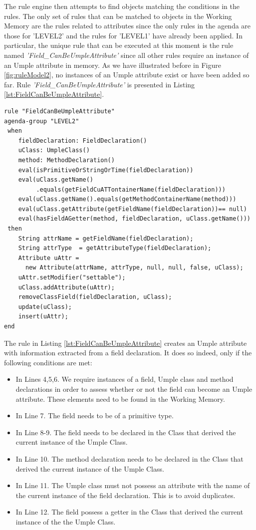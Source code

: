 The rule engine then attempts to find objects matching the conditions in the rules. The only set of rules that can be matched to objects in the Working Memory are the rules related to attributes since the only rules in the agenda are those for 'LEVEL2' and the rules for 'LEVEL1' have already been applied. In particular, the unique rule
that can be executed at this moment is the rule named \textit{'Field\_CanBeUmpleAttribute'} since all other rules require an instance of an Umple attribute in memory. As we have illustrated before in Figure \ref{fig:ruleModel2}, no instances of an Umple attribute exist or have been added so far. Rule \textit{'Field\_CanBeUmpleAttribute'} is presented in Listing \ref{lst:FieldCanBeUmpleAttribute}.

\begin{lstlisting}[language={drools},label=lst:FieldCanBeUmpleAttribute, caption=Rule  FieldCanBeUmpleAttribute]
rule "FieldCanBeUmpleAttribute"
agenda-group "LEVEL2" 
 when
	fieldDeclaration: FieldDeclaration()
	uClass: UmpleClass()
	method: MethodDeclaration()
	eval(isPrimitiveOrStringOrTime(fieldDeclaration))				   
	eval(uClass.getName()
	     .equals(getFieldCuATTontainerName(fieldDeclaration)))
	eval(uClass.getName().equals(getMethodContainerName(method)))
	eval(uClass.getAttribute(getFieldName(fieldDeclaration))== null)
	eval(hasFieldAGetter(method, fieldDeclaration, uClass.getName()))
 then 
	String attrName = getFieldName(fieldDeclaration);
	String attrType  = getAttributeType(fieldDeclaration);
	Attribute uAttr = 
	  new Attribute(attrName, attrType, null, null, false, uClass);
	uAttr.setModifier("settable");
	uClass.addAttribute(uAttr);
	removeClassField(fieldDeclaration, uClass);
	update(uClass);    	
	insert(uAttr);
end
\end{lstlisting}

The rule in Listing \ref{lst:FieldCanBeUmpleAttribute} creates an Umple attribute with information extracted from a field declaration. It does so indeed, only if the following conditions are met:
\begin{itemize}
\item In Lines 4,5,6. We require instances of a field, Umple class and method declarations in order to assess whether or not the field can become an Umple attribute. These elements need to be found in the Working Memory. 
\item In Line 7. The field needs to be of a primitive type.
\item In Line 8-9. The field needs to be declared in the Class that derived the current instance of the Umple Class.
\item In Line 10. The method declaration needs to be declared in the Class that derived the current instance of the Umple Class.
\item In Line 11. The Umple class must not possess an attribute with the name of the current instance of the field declaration. This is to avoid duplicates.
\item In Line 12. The field possess a getter in the Class that derived the current instance of the the Umple Class.
\end{itemize}


